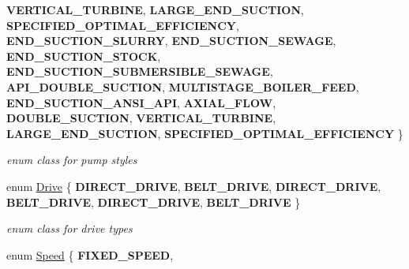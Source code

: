 \begin{DoxyCompactItemize}
{\bfseries V\+E\+R\+T\+I\+C\+A\+L\+\_\+\+T\+U\+R\+B\+I\+NE}, 
{\bfseries L\+A\+R\+G\+E\+\_\+\+E\+N\+D\+\_\+\+S\+U\+C\+T\+I\+ON}, 
{\bfseries S\+P\+E\+C\+I\+F\+I\+E\+D\+\_\+\+O\+P\+T\+I\+M\+A\+L\+\_\+\+E\+F\+F\+I\+C\+I\+E\+N\+CY}, 
\newline
{\bfseries E\+N\+D\+\_\+\+S\+U\+C\+T\+I\+O\+N\+\_\+\+S\+L\+U\+R\+RY}, 
{\bfseries E\+N\+D\+\_\+\+S\+U\+C\+T\+I\+O\+N\+\_\+\+S\+E\+W\+A\+GE}, 
{\bfseries E\+N\+D\+\_\+\+S\+U\+C\+T\+I\+O\+N\+\_\+\+S\+T\+O\+CK}, 
{\bfseries E\+N\+D\+\_\+\+S\+U\+C\+T\+I\+O\+N\+\_\+\+S\+U\+B\+M\+E\+R\+S\+I\+B\+L\+E\+\_\+\+S\+E\+W\+A\+GE}, 
\newline
{\bfseries A\+P\+I\+\_\+\+D\+O\+U\+B\+L\+E\+\_\+\+S\+U\+C\+T\+I\+ON}, 
{\bfseries M\+U\+L\+T\+I\+S\+T\+A\+G\+E\+\_\+\+B\+O\+I\+L\+E\+R\+\_\+\+F\+E\+ED}, 
{\bfseries E\+N\+D\+\_\+\+S\+U\+C\+T\+I\+O\+N\+\_\+\+A\+N\+S\+I\+\_\+\+A\+PI}, 
{\bfseries A\+X\+I\+A\+L\+\_\+\+F\+L\+OW}, 
\newline
{\bfseries D\+O\+U\+B\+L\+E\+\_\+\+S\+U\+C\+T\+I\+ON}, 
{\bfseries V\+E\+R\+T\+I\+C\+A\+L\+\_\+\+T\+U\+R\+B\+I\+NE}, 
{\bfseries L\+A\+R\+G\+E\+\_\+\+E\+N\+D\+\_\+\+S\+U\+C\+T\+I\+ON}, 
{\bfseries S\+P\+E\+C\+I\+F\+I\+E\+D\+\_\+\+O\+P\+T\+I\+M\+A\+L\+\_\+\+E\+F\+F\+I\+C\+I\+E\+N\+CY}
 \}\begin{DoxyCompactList}\small\item\em enum class for pump styles \end{DoxyCompactList}
\item 
\mbox{\label{class_pump_a32bf0ade131a11bb3b3fb374f638e983}} 
enum \hyperlink{class_pump_a32bf0ade131a11bb3b3fb374f638e983}{Drive} \{ \newline
{\bfseries D\+I\+R\+E\+C\+T\+\_\+\+D\+R\+I\+VE}, 
{\bfseries B\+E\+L\+T\+\_\+\+D\+R\+I\+VE}, 
{\bfseries D\+I\+R\+E\+C\+T\+\_\+\+D\+R\+I\+VE}, 
{\bfseries B\+E\+L\+T\+\_\+\+D\+R\+I\+VE}, 
\newline
{\bfseries D\+I\+R\+E\+C\+T\+\_\+\+D\+R\+I\+VE}, 
{\bfseries B\+E\+L\+T\+\_\+\+D\+R\+I\+VE}
 \}\begin{DoxyCompactList}\small\item\em enum class for drive types \end{DoxyCompactList}
\item 
\mbox{\label{class_pump_ae443603074ebca82f0b89209482d10b6}} 
enum \hyperlink{class_pump_ae443603074ebca82f0b89209482d10b6}{Speed} \{ \newline
{\bfseries F\+I\+X\+E\+D\+\_\+\+S\+P\+E\+ED}, 

\end{DoxyCompactItemize}
